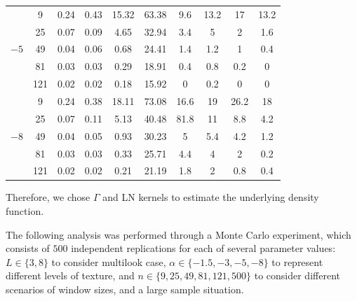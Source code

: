 \documentclass[twocolumn]{svjour3}
\begin{document}
\begin{table}[hbt]
\begin{tabular}{c c S[table-format=2.2]S[table-format=2.2]S[table-format=2.2] S[table-format=2.2] @{\hskip 8mm} S[table-format=2.2]S[table-format=2.2]S[table-format=2.2]S[table-format=2.2]}
			\midrule                                        
			&  9       &       0.24     &     0.43     &     15.32     &     63.38     &    9.6    &    13.2    &   17         &    13.2 \\                    
			&  25      &       0.07     &     0.09     &     4.65      &     32.94     &    3.4    &   5        &    2         &    1.6 \\                    
			&  49      &       0.04     &     0.06     &     0.68      &     24.41     &    1.4    &    1.2     &    1         &    0.4 \\
			&  81      &       0.03     &     0.03     &     0.29      &     18.91     &    0.4    &    0.8     &    0.2       &    0 \\
			&  121     &       0.02     &     0.02     &     0.18      &     15.92     &    0      &    0.2     &    0         &    0 \\
			
			\midrule                                        
			&  9       &       0.24     &     0.38     &     18.11     &     73.08     &    16.6    &    19     & 26.2         &    18 \\                
			&  25      &       0.07     &     0.11     &     5.13      &     40.48     &    81.8    &   11      &    8.8       &    4.2 \\            
			&  49      &       0.04     &     0.05     &     0.93      &     30.23     &    5       &    5.4    &    4.2       &    1.2 \\    
			&  81      &       0.03     &     0.03     &     0.33      &     25.71     &    4.4     &    4      &    2         &    0.2 \\    
			&  121     &       0.02     &     0.02     &     0.21      &     21.19     &    1.8     &    2      &    0.8       &    0.4 \\
			\bottomrule
		\end{tabular}                                              
	\end{table}    
	
	Therefore, we chose $\Gamma$ and LN kernels to estimate the underlying density function.
	
	The following analysis was performed through a Monte Carlo experiment, which consists of $500$ independent replications for each of several parameter values: 
	$L\in\{3,8\}$ to consider multilook case,
	$\alpha\in\{-1.5, -3, -5, -8\}$ to represent different levels of texture, 
	and 
	$n\in\{9, 25,49, 81,121,500\}$ to consider different scenarios of window sizes, and a large sample situation.
	
\end{document}
